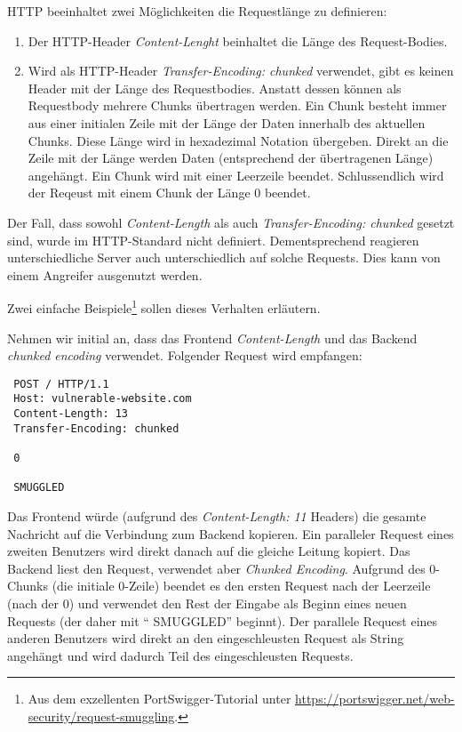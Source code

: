 HTTP beeinhaltet zwei Möglichkeiten die Requestlänge zu definieren:

\begin{enumerate}
	\item Der HTTP-Header \textit{Content-Lenght} beinhaltet die Länge des Request-Bodies.
	\item Wird als HTTP-Header \textit{Transfer-Encoding: chunked} verwendet, gibt es keinen Header mit der Länge des Requestbodies. Anstatt dessen können als Requestbody mehrere Chunks übertragen werden. Ein Chunk besteht immer aus einer initialen Zeile mit der Länge der Daten innerhalb des aktuellen Chunks. Diese Länge wird in hexadezimal Notation übergeben. Direkt an die Zeile mit der Länge werden Daten (entsprechend der übertragenen Länge) angehängt. Ein Chunk wird mit einer Leerzeile beendet. Schlussendlich wird der Reqeust mit einem Chunk der Länge 0 beendet.
\end{enumerate}

Der Fall, dass sowohl \textit{Content-Length} als auch \textit{Transfer-Encoding: chunked} gesetzt sind, wurde im HTTP-Standard nicht definiert. Dementsprechend reagieren unterschiedliche Server auch unterschiedlich auf solche Requests. Dies kann von einem Angreifer ausgenutzt werden.

Zwei einfache Beispiele\footnote{Aus dem exzellenten PortSwigger-Tutorial unter \url{https://portswigger.net/web-security/request-smuggling}.} sollen dieses Verhalten erläutern.

Nehmen wir initial an, dass das Frontend \textit{Content-Length} und das Backend \textit{chunked encoding} verwendet. Folgender Request wird empfangen:

\begin{verbatim}
 POST / HTTP/1.1
 Host: vulnerable-website.com
 Content-Length: 13
 Transfer-Encoding: chunked

 0

 SMUGGLED 
\end{verbatim}

Das Frontend würde (aufgrund des \textit{Content-Length: 11} Headers) die gesamte Nachricht auf die Verbindung zum Backend kopieren. Ein paralleler Request eines zweiten Benutzers wird direkt danach auf die gleiche Leitung kopiert. Das Backend liest den Request, verwendet aber \textit{Chunked Encoding}. Aufgrund des 0-Chunks (die initiale 0-Zeile) beendet es den ersten Request nach der Leerzeile (nach der 0) und verwendet den Rest der Eingabe als Beginn eines neuen Requests (der daher mit `` SMUGGLED'' beginnt). Der parallele Request eines anderen Benutzers wird direkt an den eingeschleusten Request als String angehängt und wird dadurch Teil des eingeschleusten Requests.

